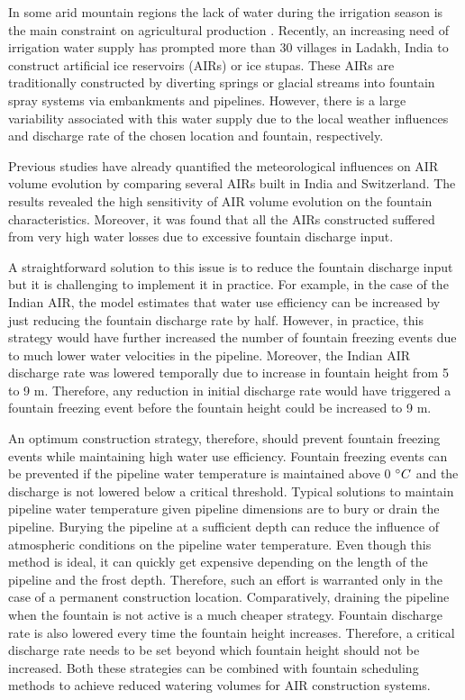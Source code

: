 \documentclass[tc, manuscript]{copernicus}
\begin{document}
\introduction

In some arid mountain regions the lack of water during the irrigation season is the main constraint on
agricultural production \citep{nusserCryosphereFedIrrigationNetworks2019} . Recently, an increasing need of irrigation water supply has prompted more than 30
villages in Ladakh, India to construct artificial ice reservoirs (AIRs) or ice stupas\citep{wangchukIceStupaCompetition2020}. These AIRs are
traditionally constructed by diverting springs or glacial streams into fountain spray systems via
embankments and pipelines. However, there is a large variability associated with this water supply due to the
local weather influences and discharge rate of the chosen location and fountain, respectively. 

Previous studies \citep{balasubramanianInfluenceMeteorologicalConditions2022,
oerlemansBriefCommunicationGrowth2021} have already quantified the meteorological influences on AIR volume
evolution by comparing several AIRs built in India and Switzerland. The results revealed the high sensitivity of
AIR volume evolution on the fountain characteristics. Moreover, it was found that all the AIRs constructed
suffered from very high water losses due to excessive fountain discharge input. 

A straightforward solution to this issue is to reduce the fountain discharge input but it is challenging to
implement it in practice. For example, in the case of the Indian AIR, the model estimates that water use
efficiency can be increased by just reducing the fountain discharge rate by half. However, in practice, this
strategy would have further increased the number of fountain freezing events due to much lower water velocities
in the pipeline. Moreover, the Indian AIR discharge rate was lowered temporally due to increase in fountain
height from 5 to 9 m. Therefore, any reduction in initial discharge rate would have triggered a fountain
freezing event before the fountain height could be increased to 9 m.

An optimum construction strategy, therefore, should prevent fountain freezing events while maintaining high
water use efficiency. Fountain freezing events can be prevented if the pipeline water temperature is maintained
above 0 $^{\circ} C$ and the discharge is not lowered below a critical threshold. Typical solutions to maintain
pipeline water temperature given pipeline dimensions are to bury or drain the pipeline. Burying the pipeline at
a sufficient depth can reduce the influence of atmospheric conditions on the pipeline water temperature. Even
though this method is ideal, it can quickly get expensive depending on the length of the pipeline and the frost
depth. Therefore, such an effort is warranted only in the case of a permanent construction location.
Comparatively, draining the pipeline when the fountain is not active is a much cheaper strategy. Fountain
discharge rate is also lowered every time the fountain height increases. Therefore, a critical discharge rate needs
to be set beyond which fountain height should not be increased. Both these strategies can be combined
with fountain scheduling methods to achieve reduced watering volumes for AIR construction systems. 
\end{document}
